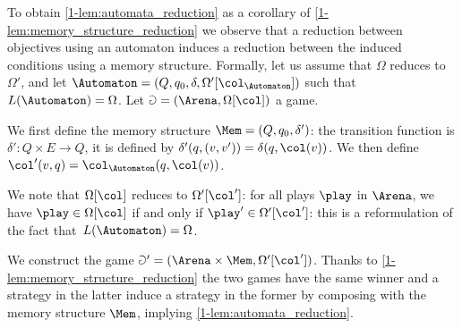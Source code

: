 To obtain \cref{1-lem:automata_reduction} as a corollary of \cref{1-lem:memory_structure_reduction}
we observe that a reduction between objectives using an automaton induces a reduction between the induced conditions using a memory structure.
Formally, let us assume that $\Omega$ reduces to $\Omega'$, 
and let $\Automaton = (Q, q_0, \delta, \Omega'[\col_\Automaton])$ such that $L(\Automaton) = \Omega$.
Let $\Game = (\Arena, \Omega[\col])$ a game.

We first define the memory structure $\Mem = (Q, q_0, \delta')$: the transition function is $\delta' : Q \times E \to Q$, it is defined
by $\delta'(q,(v,v')) = \delta(q, \col(v))$.
We then define $\col'(v,q) = \col_\Automaton(q, \col(v))$.

We note that $\Omega[\col]$ reduces to $\Omega'[\col']$: for all plays $\play$ in $\Arena$, we have 
$\play \in \Omega[\col]$ if and only if $\play' \in \Omega'[\col']$: this is a reformulation of the fact that~$L(\Automaton) = \Omega$.

We construct the game $\Game' = (\Arena \times \Mem, \Omega'[\col'])$.
Thanks to \cref{1-lem:memory_structure_reduction} the two games have the same winner and a strategy in the latter induce a strategy in the former
by composing with the memory structure $\Mem$, implying \cref{1-lem:automata_reduction}.
